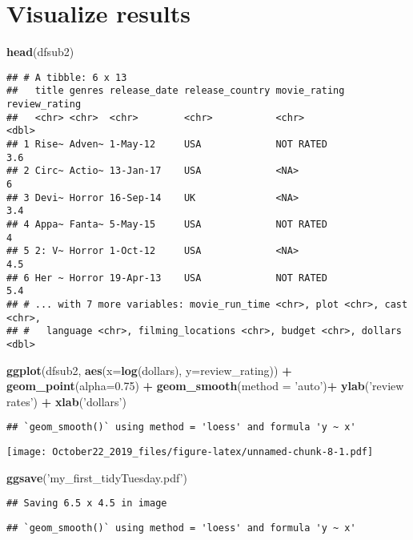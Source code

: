 \documentclass[]{article}
\newenvironment{Shaded}{\begin{snugshade}}{\end{snugshade}}
\newcommand{\KeywordTok}[1]{\textcolor[rgb]{0.13,0.29,0.53}{\textbf{#1}}}
\newcommand{\DataTypeTok}[1]{\textcolor[rgb]{0.13,0.29,0.53}{#1}}
\newcommand{\FloatTok}[1]{\textcolor[rgb]{0.00,0.00,0.81}{#1}}
\newcommand{\StringTok}[1]{\textcolor[rgb]{0.31,0.60,0.02}{#1}}
\newcommand{\OperatorTok}[1]{\textcolor[rgb]{0.81,0.36,0.00}{\textbf{#1}}}
\newcommand{\NormalTok}[1]{#1}
\begin{document}
\section{Visualize results}\label{visualize-results}

\begin{Shaded}
\begin{Highlighting}[]
\KeywordTok{head}\NormalTok{(dfsub2)}
\end{Highlighting}
\end{Shaded}

\begin{verbatim}
## # A tibble: 6 x 13
##   title genres release_date release_country movie_rating review_rating
##   <chr> <chr>  <chr>        <chr>           <chr>                <dbl>
## 1 Rise~ Adven~ 1-May-12     USA             NOT RATED              3.6
## 2 Circ~ Actio~ 13-Jan-17    USA             <NA>                   6  
## 3 Devi~ Horror 16-Sep-14    UK              <NA>                   3.4
## 4 Appa~ Fanta~ 5-May-15     USA             NOT RATED              4  
## 5 2: V~ Horror 1-Oct-12     USA             <NA>                   4.5
## 6 Her ~ Horror 19-Apr-13    USA             NOT RATED              5.4
## # ... with 7 more variables: movie_run_time <chr>, plot <chr>, cast <chr>,
## #   language <chr>, filming_locations <chr>, budget <chr>, dollars <dbl>
\end{verbatim}

\begin{Shaded}
\begin{Highlighting}[]
\KeywordTok{ggplot}\NormalTok{(dfsub2, }\KeywordTok{aes}\NormalTok{(}\DataTypeTok{x=}\KeywordTok{log}\NormalTok{(dollars), }\DataTypeTok{y=}\NormalTok{review_rating)) }\OperatorTok{+}\StringTok{ }\KeywordTok{geom_point}\NormalTok{(}\DataTypeTok{alpha=}\FloatTok{0.75}\NormalTok{) }\OperatorTok{+}\StringTok{ }\KeywordTok{geom_smooth}\NormalTok{(}\DataTypeTok{method =} \StringTok{'auto'}\NormalTok{)}\OperatorTok{+}\StringTok{ }\KeywordTok{ylab}\NormalTok{(}\StringTok{'review rates'}\NormalTok{) }\OperatorTok{+}\StringTok{ }\KeywordTok{xlab}\NormalTok{(}\StringTok{'dollars'}\NormalTok{)}
\end{Highlighting}
\end{Shaded}

\begin{verbatim}
## `geom_smooth()` using method = 'loess' and formula 'y ~ x'
\end{verbatim}

\texttt{[image: October22\_2019\_files/figure-latex/unnamed-chunk-8-1.pdf]}

\begin{Shaded}
\begin{Highlighting}[]
\KeywordTok{ggsave}\NormalTok{(}\StringTok{'my_first_tidyTuesday.pdf'}\NormalTok{)}
\end{Highlighting}
\end{Shaded}

\begin{verbatim}
## Saving 6.5 x 4.5 in image
\end{verbatim}

\begin{verbatim}
## `geom_smooth()` using method = 'loess' and formula 'y ~ x'
\end{verbatim}
\end{document}
